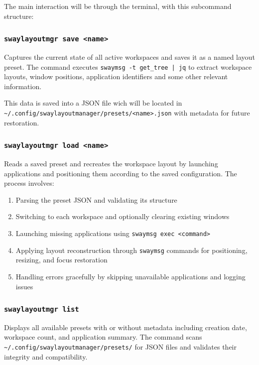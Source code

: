 \documentclass[12pt, letterpaper]{article}
\begin{document}
The main interaction will be through the terminal, with this subcommand structure:

\subsubsection*{\texttt{swaylayoutmgr save <name>}}

Captures the current state of all active workspaces and saves it as a named layout preset. The command executes \texttt{swaymsg -t get\_tree | jq} to extract workspace layouts, window positions, application identifiers and some other relevant information.

This data is saved into a JSON file wich will be located in \texttt{\~{}/.config/swaylayoutmanager/presets/<name>.json} with metadata for future restoration.

\subsubsection*{\texttt{swaylayoutmgr load <name>}}

Reads a saved preset and recreates the workspace layout by launching applications and positioning them according to the saved configuration. The process involves:

\begin{enumerate}
    \item Parsing the preset JSON and validating its structure
    \item Switching to each workspace and optionally clearing existing windows
    \item Launching missing applications using \texttt{swaymsg exec <command>}
    \item Applying layout reconstruction through \texttt{swaymsg} commands for positioning, resizing, and focus restoration
    \item Handling errors gracefully by skipping unavailable applications and logging issues
\end{enumerate}

\subsubsection*{\texttt{swaylayoutmgr list}}

Displays all available presets with or without metadata including creation date, workspace count, and application summary. The command scans \texttt{\~{}/.config/swaylayoutmanager/presets/} for JSON files and validates their integrity and compatibility.
\end{document}
